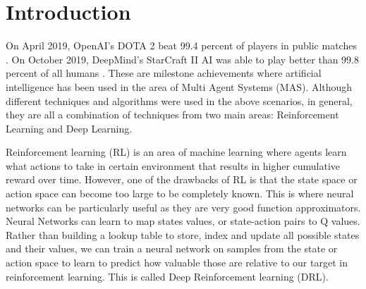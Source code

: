 \documentclass[12pt]{report}
\begin{document}
%
\listoffigures

\newpage
{}%
\listofalgorithms
\newpage
{}%
\listoftables
\newpage

\chapter{Introduction}            


On April 2019, OpenAI's DOTA 2 beat 99.4 percent of players in public matches \cite{dota2}. On October 2019, DeepMind's StarCraft II AI was able to play better than 99.8 percent of all humans \cite{Starcraft2}. These are milestone achievements where artificial intelligence has been used in the area of Multi Agent Systems (MAS). Although different techniques and algorithms were used in the above scenarios, in general, they are all a combination of techniques from two main areas: Reinforcement Learning and Deep Learning. 

Reinforcement learning (RL) is an area of machine learning where agents learn what actions to take in certain environment that results in higher cumulative reward over time. However, one of the drawbacks of RL is that the state space or action space can become too large to be completely known. This is where neural networks can be particularly useful as they are very good function approximators. Neural Networks can learn to map states values, or state-action pairs to Q values. Rather than building a lookup table to store, index and update all possible states and their values, we can train a neural network on samples from the state or action space to learn to predict how valuable those are relative to our target in reinforcement learning. This is called Deep Reinforcement learning (DRL). 
\end{document}
